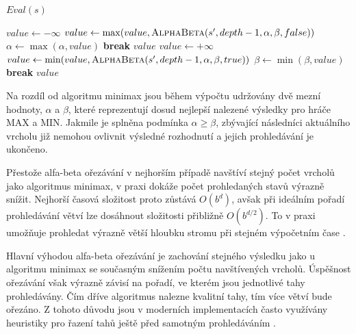 \begin{algorithm}[H]
\caption{Algoritmus alfa-beta ořezávání}
\label{alg:alphabeta}
\begin{algorithmic}[1]
        \State \Return $Eval(s)$
    \EndIf

        \State $value \gets -\infty$
            \State $value \gets \max(value,\Call{AlphaBeta}{s', depth-1,\alpha,\beta,false})$
            \State $\alpha \gets \max(\alpha,value)$
            \If{$\alpha \geq \beta$}
                \State \textbf{break}
            \EndIf
        \EndFor
        \State \Return $value$
    \Else
        \State $value \gets +\infty$
            \State $value \gets \min(value,\Call{AlphaBeta}{s', depth-1,\alpha,\beta,true})$
            \State $\beta \gets \min(\beta,value)$
            \If{$\alpha \geq \beta$}
                \State \textbf{break}
            \EndIf
        \EndFor
        \State \Return $value$
    \EndIf
\EndFunction
\end{algorithmic}
\end{algorithm}

Na rozdíl od algoritmu minimax jsou během výpočtu udržovány dvě mezní hodnoty, $\alpha$ a $\beta$,
které reprezentují dosud nejlepší nalezené výsledky pro hráče MAX a MIN. Jakmile je splněna podmínka
$\alpha \geq \beta$, zbývající následníci aktuálního vrcholu již nemohou ovlivnit výsledné rozhodnutí 
a jejich prohledávání je ukončeno.

Přestože alfa-beta ořezávání v nejhorším případě navštíví stejný počet vrcholů jako algoritmus minimax,
v praxi dokáže počet prohledaných stavů výrazně snížit. Nejhorší časová složitost proto zůstává $O(b^d)$, avšak 
při ideálním pořadí prohledávání větví lze dosáhnout složitosti přibližně $O(b^{d/2})$. To v praxi umožňuje prohledat
výrazně větší hloubku stromu při stejném výpočetním čase \cite{russell2021aima}.

Hlavní výhodou alfa-beta ořezávání je zachování stejného výsledku jako u algoritmu minimax se současným snížením 
počtu navštívených vrcholů. Úspěšnost ořezávání však výrazně závisí na pořadí, ve kterém jsou jednotlivé tahy prohledávány.
Čím dříve algoritmus nalezne kvalitní tahy, tím více větví bude ořezáno. Z tohoto důvodu jsou v moderních implementacích
často využívány heuristiky pro řazení tahů ještě před samotným prohledáváním \cite{russell2021aima}.

